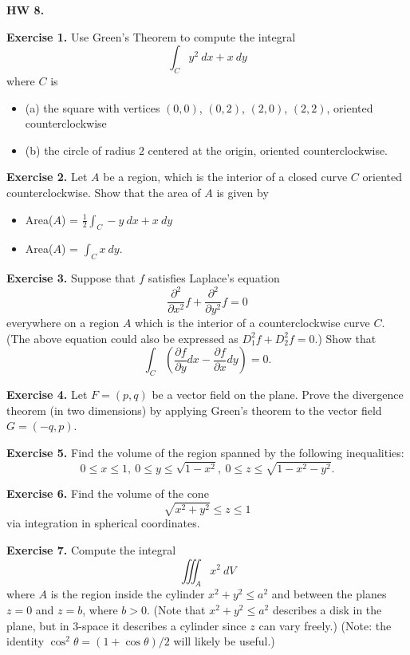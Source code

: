 \documentclass{article}
\begin{document}

\textbf{HW 8.}

\textbf{Exercise 1.} Use Green's Theorem to compute the integral 
\[\int_C y^2\ dx + x\ dy\]
where $C$ is
\begin{itemize}
    \item (a) the square with vertices $(0,0)$, $(0,2)$, $(2,0)$, $(2,2)$, oriented counterclockwise
    \item (b) the circle of radius $2$ centered at the origin, oriented counterclockwise.
\end{itemize}

\textbf{Exercise 2.} Let $A$ be a region, which is the interior of a closed curve $C$
oriented counterclockwise. Show that the area of $A$ is given by
\begin{itemize}
    \item Area($A$) = $\frac{1}{2}\int_C -y\ dx + x\ dy$
    \item Area($A$) = $\int_C x\ dy$.
\end{itemize}

\textbf{Exercise 3.} Suppose that $f$ satisfies Laplace's equation
\[\frac{\partial^2}{\partial x^2} f + \frac{\partial^2}{\partial y^2} f = 0\]
everywhere on a region $A$ which is the interior of a counterclockwise curve $C$.
(The above equation could also be expressed as 
$D_1^2 f + D_2^2 f = 0$.)
Show that 
\[\int_C \left( \frac{\partial f}{\partial y}dx - \frac{\partial f}{\partial x} dy \right) = 0.\]

\textbf{Exercise 4.} Let $F = (p,q)$ be a vector field on the plane. Prove the divergence theorem (in two dimensions) by applying Green's theorem to the
vector field $G = (-q,p)$.

\textbf{Exercise 5.} Find the volume of the region spanned by the following inequalities:
\[0 \leq x \leq 1,\ 0 \leq y \leq \sqrt{1-x^2},\ 0 \leq z \leq \sqrt{1-x^2-y^2}.\]

\textbf{Exercise 6.} Find the volume of the cone 
\[\sqrt{x^2+y^2} \leq z \leq 1\]
via integration in spherical coordinates.

\textbf{Exercise 7.} Compute the integral 
\[\iiint_A x^2\ dV\]
where $A$ is the region inside the cylinder $x^2+y^2 \leq a^2$ and between the planes $z = 0$ and $z = b$, where $b>0$.
(Note that $x^2+y^2 \leq a^2$ describes a disk in the plane, but in 3-space it describes a cylinder since $z$ can vary freely.)
(Note: the identity $\cos^2 \theta = (1 + \cos\theta)/2$ will likely be useful.)
\end{document}
